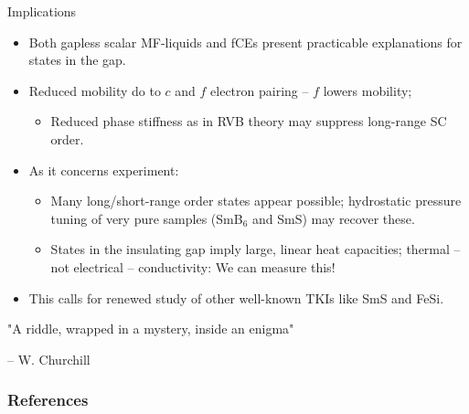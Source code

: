 \documentclass{beamer}
\begin{document}
\begin{frame}{Implications}
    
    \begin{itemize}
        \item Both gapless scalar MF-liquids and fCEs present practicable explanations for states in the gap.
        
        \item Reduced mobility do to $c$ and $f$ electron pairing -- $f$ lowers mobility; 
        \begin{itemize}
            \item Reduced phase stiffness as in RVB theory may suppress long-range SC order.
        \end{itemize}
        
        \item As it concerns experiment:
        \begin{itemize}
            \item Many long/short-range order states appear possible; hydrostatic pressure tuning of very pure samples (SmB$_6$ and SmS) may recover these.
            
            \item States in the insulating gap imply large, linear heat capacities; thermal -- not electrical -- conductivity: We can measure this!
        \end{itemize}
        
        \item This calls for renewed study of other well-known TKIs like SmS and FeSi.

    \end{itemize}
    
\end{frame}




\begin{frame}{}

    \centering "A riddle, wrapped in a mystery, inside an enigma" 
    
    -- W. Churchill
    
\end{frame}




\begin{frame}[allowframebreaks]
        \frametitle{References}
        
        

\end{frame}


\end{document}
